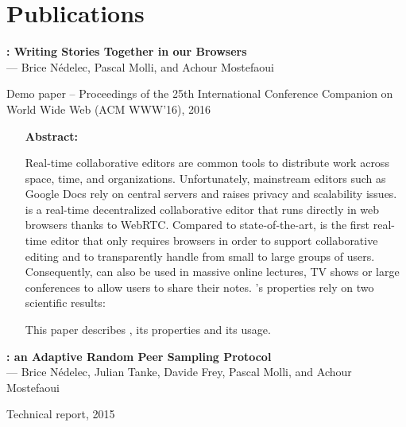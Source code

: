 
\section{Publications}


\noindent \textbf{\CRATE: Writing Stories Together in our Browsers}\\
\indent --- Brice Nédelec, Pascal Molli, and Achour Mostefaoui

\noindent Demo paper -- Proceedings of the 25th International Conference
Companion on World Wide Web (ACM WWW'16), 2016

\begin{itemize}
\item [\textbf{Abstract:}] {\small Real-time collaborative editors are common
    tools to distribute work across space, time, and
    organizations. Unfortunately, mainstream editors such as Google Docs rely on
    central servers and raises privacy and scalability issues.  \CRATE is a
    real-time decentralized collaborative editor that runs directly in web
    browsers thanks to WebRTC. Compared to state-of-the-art, \CRATE is the first
    real-time editor that only requires browsers in order to support
    collaborative editing and to transparently handle from small to large groups
    of users. Consequently, \CRATE can also be used in massive online lectures,
    TV shows or large conferences to allow users to share their notes. \CRATE's
    properties rely on two scientific results:
  This paper describes \CRATE, its properties and its usage.}
\end{itemize}


\noindent \textbf{\SPRAY: an Adaptive Random Peer Sampling Protocol}\\
\indent --- Brice Nédelec, Julian Tanke, Davide Frey, Pascal Molli, and Achour
Mostefaoui

\noindent Technical report, 2015

